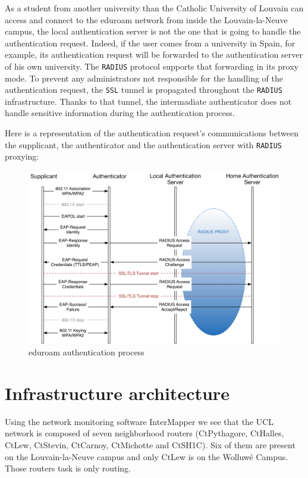 As a student from another university than the Catholic University of Louvain can access and connect to the eduroam network from inside the Louvain-la-Neuve campus, the local authentication server is not the one that is going to handle the authentication request. Indeed, if the user comes from a university in Spain, for example, its authentication request will be forwarded to the authentication server of his own university. The \texttt{RADIUS} protocol supports that forwarding in its proxy mode. To prevent any administrators not responsible for the handling of the authentication request, the \texttt{SSL} tunnel is propagated throughout the \texttt{RADIUS} infrastructure. Thanks to that tunnel, the intermadiate authenticator does not handle sensitive information during the authentication process.

Here is a representation of the authentication request's communications between the supplicant, the authenticator and the authentication server with \texttt{RADIUS} proxying:
\begin{figure}[H]
	\includegraphics[width=1\linewidth]{Pictures/Chapter2/eduroam1.png}
	\caption{eduroam authentication process}
\end{figure}



\section{Infrastructure architecture}
Using the network monitoring software InterMapper\cite{intermapper} we see that the UCL network is composed of seven neighborhood routers (CtPythagore, CtHalles, CtLew, CtStevin, CtCarnoy, CtMichotte and CtSH1C). Six of them are present on the Louvain-la-Neuve campus and only CtLew is on the Wolluwé Campus. Those routers task is only routing.\\

